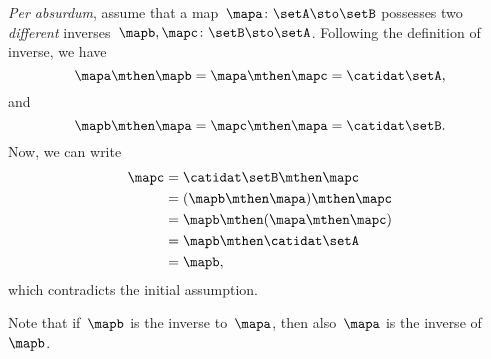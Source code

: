 \begin{solution}
    \emph{Per absurdum}, assume that a map~$\mapa\colon \setA \sto \setB$ possesses two \emph{different} inverses~$\mapb,\mapc\colon \setB \sto \setA$.
    Following the definition of inverse, we have
    \begin{equation}
        \mapa \mthen \mapb=\mapa \mthen \mapc=\catidat\setA,
    \end{equation}
    and
    \begin{equation}
        \mapb \mthen \mapa=\mapc \mthen \mapa=\catidat\setB.
    \end{equation}
    Now, we can write
    \begin{equation}
        \begin{aligned}
            \mapc & =\catidat\setB \mthen \mapc \\
                  & =(\mapb \mthen \mapa)\mthen \mapc \\
                  & =\mapb\mthen (\mapa \mthen \mapc) \\
                  & =\mapb \mthen \catidat\setA \\
                  & =\mapb,
        \end{aligned}
    \end{equation}
    which contradicts the initial assumption.
\end{solution}

\begin{remark}
    Note that if~$\mapb$ is the inverse to~$\mapa$, then also~$\mapa$ is the inverse of~$\mapb$.
\end{remark}

